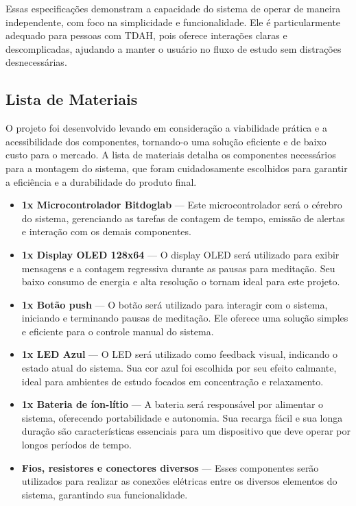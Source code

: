 \documentclass{article}
\begin{document}
Essas especificações demonstram a capacidade do sistema de operar de maneira independente, com foco na simplicidade e funcionalidade. Ele é particularmente adequado para pessoas com TDAH, pois oferece interações claras e descomplicadas, ajudando a manter o usuário no fluxo de estudo sem distrações desnecessárias.


\subsection{Lista de Materiais}

O projeto foi desenvolvido levando em consideração a viabilidade prática e a acessibilidade dos componentes, tornando-o uma solução eficiente e de baixo custo para o mercado. A lista de materiais detalha os componentes necessários para a montagem do sistema, que foram cuidadosamente escolhidos para garantir a eficiência e a durabilidade do produto final.

\begin{itemize} \item \textbf{1x Microcontrolador Bitdoglab} — Este microcontrolador será o cérebro do sistema, gerenciando as tarefas de contagem de tempo, emissão de alertas e interação com os demais componentes.
  \item \textbf{1x Display OLED 128x64} — O display OLED será utilizado para exibir mensagens e a contagem regressiva durante as pausas para meditação. Seu baixo consumo de energia e alta resolução o tornam ideal para este projeto.

\item \textbf{1x Botão push} — O botão será utilizado para interagir com o sistema, iniciando e terminando pausas de meditação. Ele oferece uma solução simples e eficiente para o controle manual do sistema.

\item \textbf{1x LED Azul} — O LED será utilizado como feedback visual, indicando o estado atual do sistema. Sua cor azul foi escolhida por seu efeito calmante, ideal para ambientes de estudo focados em concentração e relaxamento.

\item \textbf{1x Bateria de íon-lítio} — A bateria será responsável por alimentar o sistema, oferecendo portabilidade e autonomia. Sua recarga fácil e sua longa duração são características essenciais para um dispositivo que deve operar por longos períodos de tempo.

\item \textbf{Fios, resistores e conectores diversos} — Esses componentes serão utilizados para realizar as conexões elétricas entre os diversos elementos do sistema, garantindo sua funcionalidade.
\end{itemize}
\end{document}
